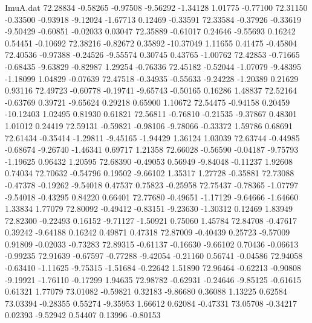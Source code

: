 \begin{filecontents}{ImuA.dat}
  72.28834   -0.58265   -0.97508   -9.56292   -1.34128    1.01775   -0.77100
  72.31150   -0.33500   -0.93918   -9.12024   -1.67713    0.12469   -0.33591
  72.33584   -0.37926   -0.33619   -9.50429   -0.60851   -0.02033    0.03047
  72.35889   -0.61017    0.24646   -9.55693    0.16242    0.54451   -0.10692
  72.38216   -0.82672    0.35892  -10.37049    1.11655    0.41475   -0.45804
  72.40536   -0.97388   -0.24526   -9.55574    0.30745    0.43765   -1.00762
  72.42853   -0.71665   -0.68435   -9.63829   -0.82987    1.29254   -0.76336
  72.45182   -0.52044   -1.07079   -9.48395   -1.18099    1.04829   -0.07639
  72.47518   -0.34935   -0.55633   -9.24228   -1.20389    0.21629    0.93116
  72.49723   -0.60778   -0.19741   -9.65743   -0.50165    0.16286    1.48837
  72.52164   -0.63769    0.39721   -9.65624    0.29218    0.65900    1.10672
  72.54475   -0.94158    0.20459  -10.12403    1.02495    0.81930    0.61821
  72.56811   -0.76810   -0.21535   -9.37867    0.48301    1.01012    0.24419
  72.59131   -0.59821   -0.98106   -9.78066   -0.33372    1.59786    0.68691
  72.61434   -0.35414   -1.29811   -9.45165   -1.94429    1.36124    1.03039
  72.63744   -0.44985   -0.68674   -9.26740   -1.46341    0.69717    1.21358
  72.66028   -0.56590   -0.04187   -9.75793   -1.19625    0.96432    1.20595
  72.68390   -0.49053    0.56949   -9.84048   -0.11237    1.92608    0.74034
  72.70632   -0.54796    0.19502   -9.66102    1.35317    1.27728   -0.35881
  72.73088   -0.47378   -0.19262   -9.54018    0.47537    0.75823   -0.25958
  72.75437   -0.78365   -1.07797   -9.54018   -0.43295    0.84220    0.66401
  72.77680   -0.49651   -1.17129   -9.64666   -1.64660    1.33834    1.77079
  72.80092   -0.49412   -0.83151   -9.23630   -1.30312    0.12469    1.83949
  72.82300   -0.22493    0.16152   -9.71127   -1.50921    0.75060    1.45784
  72.84708   -0.47617    0.39242   -9.64188    0.16242    0.49871    0.47318
  72.87009   -0.40439    0.25723   -9.57009    0.91809   -0.02033   -0.73283
  72.89315   -0.61137   -0.16630   -9.66102    0.70436   -0.06613   -0.99235
  72.91639   -0.67597   -0.77288   -9.42054   -0.21160    0.56741   -0.04586
  72.94058   -0.63410   -1.11625   -9.75315   -1.51684   -0.22642    1.51890
  72.96464   -0.62213   -0.90808   -9.19921   -1.76110   -0.17299    1.94635
  72.98782   -0.62931   -0.24646   -9.85125   -0.61615    0.61321    1.77079
  73.01082   -0.59821    0.32183   -9.86680    0.36088    1.13225    0.62584
  73.03394   -0.28355    0.55274   -9.35953    1.66612    0.62084   -0.47331
  73.05708   -0.34217    0.02393   -9.52942    0.54407    0.13996   -0.80153

\end{filecontents}
